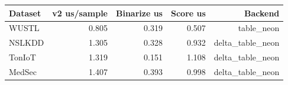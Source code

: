 \begin{tabular}{lrrrr}
\toprule
Dataset & v2 us/sample & Binarize us & Score us & Backend \\
\midrule
WUSTL & 0.805 & 0.319 & 0.507 & table\_neon \\
NSLKDD & 1.305 & 0.328 & 0.932 & delta\_table\_neon \\
TonIoT & 1.319 & 0.151 & 1.108 & delta\_table\_neon \\
MedSec & 1.407 & 0.393 & 0.998 & delta\_table\_neon \\
\bottomrule
\end{tabular}

